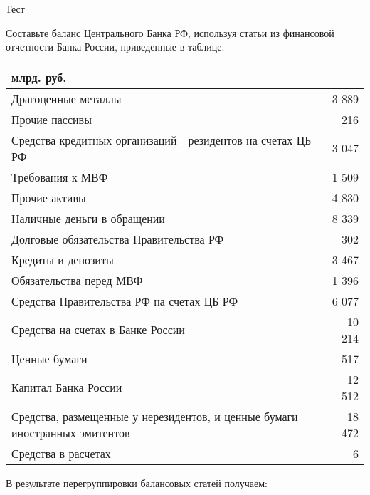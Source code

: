 \documentclass[12pt, table]{exam}
\begin{document}
\setcounter{section}{0\relax}%
\noindent
\normalsize

\begin{questions}
\question[40] Тест
\answerstotest

\pagebreak
\question[10] Составьте баланс Центрального Банка РФ, используя статьи из финансовой отчетности Банка России, приведенные в таблице. 

\small
\begin{tabularx}{\linewidth}[b]{@{}>{\raggedright\arraybackslash}Xr@{}}
	млрд. руб.\\
	\toprule
	Драгоценные металлы &               3 889    \\
	Прочие пассивы &                  216    \\
	Средства кредитных организаций - резидентов на счетах ЦБ РФ &               3 047    \\
	Требования к МВФ &               1 509    \\
	Прочие активы &               4 830    \\
	Наличные деньги в обращении &               8 339    \\
	Долговые обязательства Правительства РФ &                  302    \\
	Кредиты и депозиты &               3 467    \\
	Обязательства перед МВФ &               1 396    \\
	Средства Правительства РФ на счетах ЦБ РФ &               6 077    \\
	Средства на счетах в Банке России &             10 214    \\
	Ценные бумаги &                  517    \\
	Капитал Банка России &             12 512    \\
	Средства, размещенные у нерезидентов, и ценные бумаги иностранных эмитентов &             18 472    \\
	Средства в расчетах &                      6    \\
	\bottomrule
\end{tabularx}%
\normalsize
\begin{solution}[12em] В результате перегруппировки балансовых статей получаем:
	

\end{solution}
\end{questions}
\end{document}
